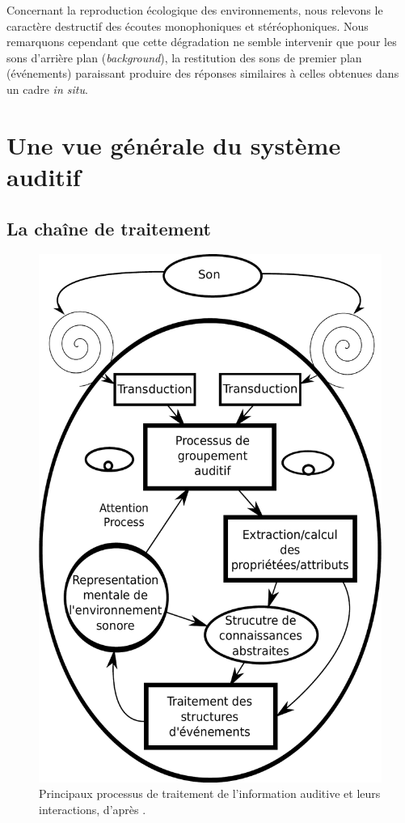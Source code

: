 Concernant la reproduction écologique des environnements, nous relevons le caractère destructif des écoutes monophoniques et stéréophoniques. Nous remarquons cependant que cette dégradation ne semble intervenir que pour les sons d'arrière plan (\emph{background}), la restitution des sons de premier plan (événements) paraissant produire des réponses similaires à celles obtenues dans un cadre \emph{in situ}.

\section{Une vue générale du système auditif}
\label{sec:ch3_generalViewAudition}

\subsection{La chaîne de traitement}
\label{sec:ch3_chaineTraite}

\begin{figure}[t]
        \myfloatalign
        \includegraphics[width=.6\linewidth]{gfx/ch_3/traitementSonMcAdamsBigand}
        \caption[Principaux processus de traitement de l'information auditive et leurs interactions.]{Principaux processus de traitement de l'information auditive et leurs interactions, d'après \citep{mcadams1994penser}.}\label{fig:traitementSonMcAdamsBigand}
\end{figure}

